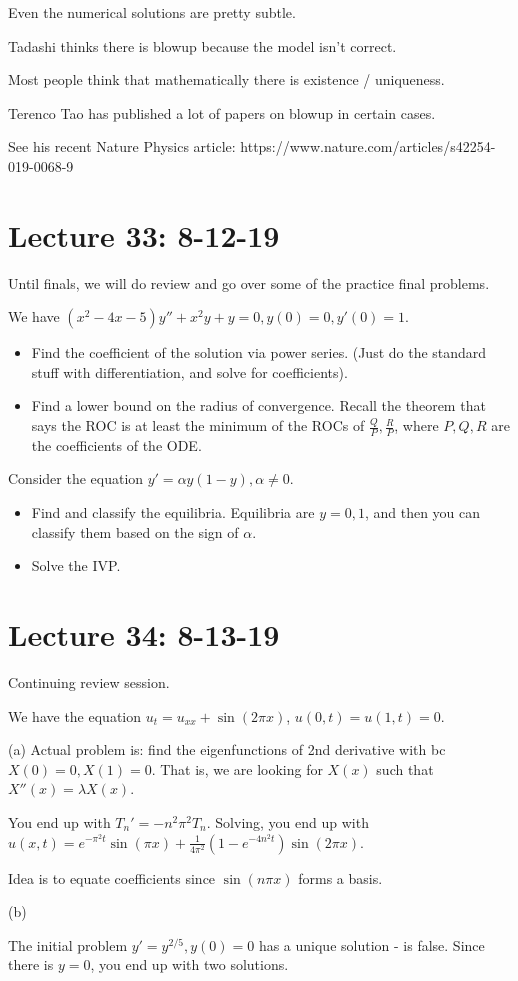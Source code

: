 \documentclass{article}
\begin{document}
Even the numerical solutions are pretty subtle.

Tadashi thinks there is blowup because the model isn't correct.

Most people think that mathematically there is existence / uniqueness.

Terenco Tao has published a lot of papers on blowup in certain cases.  

See his recent Nature Physics article: https://www.nature.com/articles/s42254-019-0068-9

\section{Lecture 33: 8-12-19}

Until finals, we will do review and go over some of the practice final problems.

We have $(x^2 - 4x - 5) y'' + x^2 y + y = 0, y(0) = 0, y'(0) = 1$.

\begin{itemize}
  \item Find the coefficient of the solution via power series.  (Just do the standard stuff with differentiation, and solve for coefficients).
  \item Find a lower bound on the radius of convergence.  Recall the theorem that says the ROC is at least the minimum of the ROCs of $\frac{Q}{P}, \frac{R}{P}$, where $P, Q, R$ are the coefficients of the ODE.
\end{itemize}

Consider the equation $y' = \alpha y(1-y), \alpha \neq 0$.

\begin{itemize}
  \item Find and classify the equilibria.  Equilibria are $y = 0, 1$, and then you can classify them based on the sign of $\alpha$.
  \item Solve the IVP.
\end{itemize}

\section{Lecture 34: 8-13-19}

Continuing review session.

We have the equation $u_t = u_{xx} + \sin (2 \pi x)$, $u(0, t) = u(1, t) = 0$.

(a) Actual problem is: find the eigenfunctions of 2nd derivative with bc $X(0) = 0, X(1) = 0$.  That is, we are looking for $X(x)$ such that $X''(x) = \lambda X(x)$.

You end up with $T_n' = - n^2 \pi^2 T_n$.  Solving, you end up with $u(x, t) = e^{- \pi^2 t} \sin (\pi x) + \frac{1}{4 \pi^2} \left( 1 - e^{- 4 n^2 t} \right) \sin (2 \pi x)$.

Idea is to equate coefficients since $\sin(n \pi x)$ forms a basis.

(b) 

The initial problem $y' = y^{2/5}, y(0) = 0$ has a unique solution - is false.  Since there is $y = 0$, you end up with two solutions.
\end{document}
